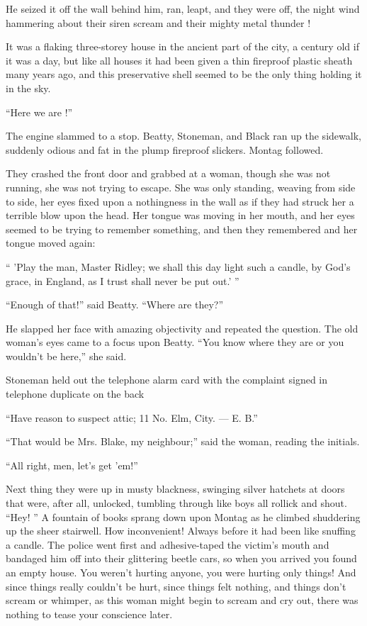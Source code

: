 \documentclass[11pt,openany]{book}
\begin{document}
He seized it off the wall behind him, ran, leapt, and they were off, the night wind hammering about their siren scream and their mighty metal thunder !

It was a flaking three-storey house in the ancient part of the city, a century old if it was a day, but like all houses it had been given a thin fireproof plastic sheath many years ago, and this preservative shell seemed to be the only thing holding it in the sky.

``Here we are !''

The engine slammed to a stop. Beatty, Stoneman, and Black ran up the sidewalk, suddenly odious and fat in the plump fireproof slickers. Montag followed.

They crashed the front door and grabbed at a woman, though she was not running, she was not trying to escape. She was only standing, weaving from side to side, her eyes fixed upon a nothingness in the wall as if they had struck her a terrible blow upon the head. Her tongue was moving in her mouth, and her eyes seemed to be trying to remember something, and then they remembered and her tongue moved again:

`` 'Play the man, Master Ridley; we shall this day light such a candle, by God's grace, in England, as I trust shall never be put out.' ''

``Enough of that!'' said Beatty. ``Where are they?''

He slapped her face with amazing objectivity and repeated the question. The old woman's eyes came to a focus upon Beatty. ``You know where they are or you wouldn't be here,'' she said.

Stoneman held out the telephone alarm card with the complaint signed in telephone duplicate on the back

``Have reason to suspect attic; 11 No. Elm, City. --- E. B.''

``That would be Mrs. Blake, my neighbour;'' said the woman, reading the initials.

``All right, men, let's get 'em!''

Next thing they were up in musty blackness, swinging silver hatchets at doors that were, after all, unlocked, tumbling through like boys all rollick and shout. ``Hey! '' A fountain of books sprang down upon Montag as he climbed shuddering up the sheer stairwell. How inconvenient! Always before it had been like snuffing a candle. The police went first and adhesive-taped the victim's mouth and bandaged him off into their glittering beetle cars, so when you arrived you found an empty house. You weren't hurting anyone, you were hurting only things! And since things really couldn't be hurt, since things felt nothing, and things don't scream or whimper, as this woman might begin to scream and cry out, there was nothing to tease your conscience later.
\end{document}
